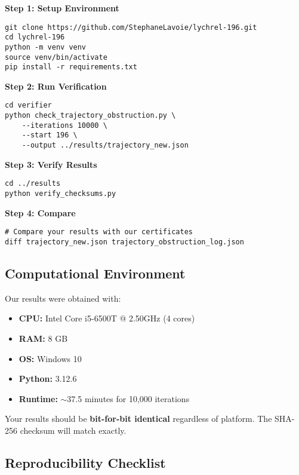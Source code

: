 \documentclass[11pt,a4paper]{article}
\begin{document}
\textbf{Step 1: Setup Environment}
\begin{lstlisting}[style=bashstyle]
git clone https://github.com/StephaneLavoie/lychrel-196.git
cd lychrel-196
python -m venv venv
source venv/bin/activate
pip install -r requirements.txt
\end{lstlisting}

\textbf{Step 2: Run Verification}
\begin{lstlisting}[style=bashstyle]
cd verifier
python check_trajectory_obstruction.py \
    --iterations 10000 \
    --start 196 \
    --output ../results/trajectory_new.json
\end{lstlisting}

\textbf{Step 3: Verify Results}
\begin{lstlisting}[style=bashstyle]
cd ../results
python verify_checksums.py
\end{lstlisting}

\textbf{Step 4: Compare}
\begin{lstlisting}[style=bashstyle]
# Compare your results with our certificates
diff trajectory_new.json trajectory_obstruction_log.json
\end{lstlisting}

\subsection{Computational Environment}

Our results were obtained with:

\begin{itemize}[leftmargin=*]
\item \textbf{CPU:} Intel Core i5-6500T @ 2.50GHz (4 cores)
\item \textbf{RAM:} 8 GB
\item \textbf{OS:} Windows 10
\item \textbf{Python:} 3.12.6
\item \textbf{Runtime:} $\sim$37.5 minutes for 10,000 iterations
\end{itemize}

\begin{tipbox}
Your results should be \textbf{bit-for-bit identical} regardless of platform. The SHA-256 checksum will match exactly.
\end{tipbox}

\subsection{Reproducibility Checklist}
\end{document}
